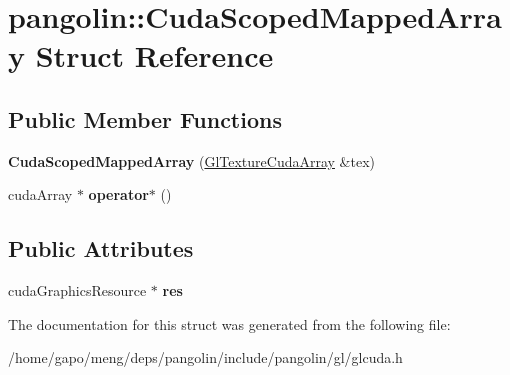 \hypertarget{structpangolin_1_1_cuda_scoped_mapped_array}{}\section{pangolin\+:\+:Cuda\+Scoped\+Mapped\+Array Struct Reference}
\label{structpangolin_1_1_cuda_scoped_mapped_array}
\subsection*{Public Member Functions}
\begin{DoxyCompactItemize}
\item 
{\bfseries Cuda\+Scoped\+Mapped\+Array} (\hyperlink{structpangolin_1_1_gl_texture_cuda_array}{Gl\+Texture\+Cuda\+Array} \&tex)\hypertarget{structpangolin_1_1_cuda_scoped_mapped_array_a5e475af1a93717dd89eb23978954c972}{}\label{structpangolin_1_1_cuda_scoped_mapped_array_a5e475af1a93717dd89eb23978954c972}

\item 
cuda\+Array $\ast$ {\bfseries operator$\ast$} ()\hypertarget{structpangolin_1_1_cuda_scoped_mapped_array_a4c2bb5b010b9f73388e6f9c6e818534d}{}\label{structpangolin_1_1_cuda_scoped_mapped_array_a4c2bb5b010b9f73388e6f9c6e818534d}

\end{DoxyCompactItemize}
\subsection*{Public Attributes}
\begin{DoxyCompactItemize}
\item 
cuda\+Graphics\+Resource $\ast$ {\bfseries res}\hypertarget{structpangolin_1_1_cuda_scoped_mapped_array_a660beb8a542d1943b61b50d441a501ef}{}\label{structpangolin_1_1_cuda_scoped_mapped_array_a660beb8a542d1943b61b50d441a501ef}

\end{DoxyCompactItemize}


The documentation for this struct was generated from the following file\+:\begin{DoxyCompactItemize}
\item 
/home/gapo/meng/deps/pangolin/include/pangolin/gl/glcuda.\+h\end{DoxyCompactItemize}

